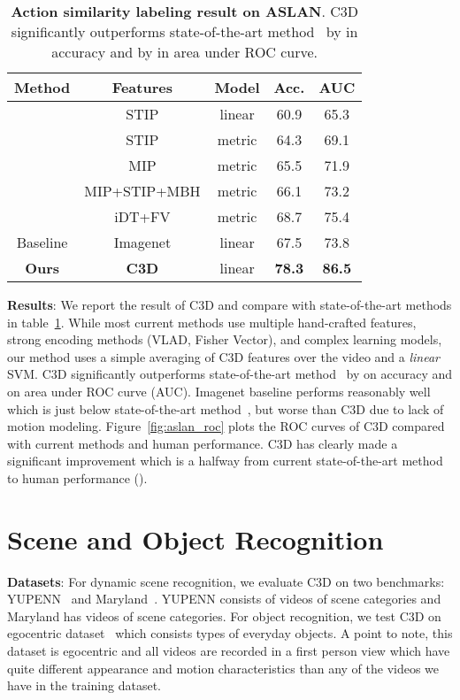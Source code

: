 \documentclass[10pt,twocolumn,letterpaper]{article}
\begin{document}
\begin{table}
\begin{center}
\begin{tabular}{|c|c|c|c|c|}
\hline
Method & Features & Model & Acc. & AUC \\
\hline
\cite{aslanPAMI12} & STIP & linear & 60.9 & 65.3 \\
\cite{aslanWS11} & STIP & metric & 64.3 & 69.1 \\
\cite{aslanECCV12} & MIP & metric & 65.5 & 71.9 \\
\cite{aslanCVPRW13} & MIP+STIP+MBH & metric & 66.1 & 73.2 \\
\cite{XPengSPL14} & iDT+FV & metric & 68.7 & 75.4 \\
Baseline & Imagenet & linear & 67.5 & 73.8 \\
{\bf Ours} & {\bf C3D} & linear & {\bf 78.3} & {\bf 86.5} \\ 
\hline
\end{tabular}
\end{center}
\vspace{-8pt}
\caption{{\bf Action similarity labeling result on ASLAN}. C3D significantly outperforms state-of-the-art method~\cite{XPengSPL14} by  in accuracy and by  in area under ROC curve.}
\label{tab:aslan_results}
\vspace{-16pt}
\end{table}

{\bf Results}: We report the result of C3D and compare with state-of-the-art methods in table~\ref{tab:aslan_results}. While most current methods use multiple hand-crafted features, strong encoding methods (VLAD, Fisher Vector), and complex learning models, our method uses a simple averaging of C3D features over the video and a \emph{linear} SVM. C3D significantly outperforms state-of-the-art method~\cite{XPengSPL14} by  on accuracy and  on area under ROC curve (AUC). Imagenet baseline performs reasonably well which is just  below state-of-the-art method~\cite{XPengSPL14}, but  worse than C3D due to lack of motion modeling. Figure~\ref{fig:aslan_roc} plots the ROC curves of C3D compared with current methods and human performance. C3D has clearly made a significant improvement which is a halfway from current state-of-the-art method to human performance (). 
\section{Scene and Object Recognition}
\label{sec:dynamic_scene}
\vspace{-6pt}
{\bf Datasets}: For dynamic scene recognition, we evaluate C3D on two benchmarks:  YUPENN~\cite{Derpanis12} and Maryland~\cite{umd_scene}. YUPENN consists of  videos of  scene categories and Maryland has  videos of  scene categories. For object recognition, we test C3D on egocentric dataset~\cite{Ren2009} which consists  types of everyday objects. A point to note, this dataset is egocentric and all videos are recorded in a first person view which have quite different appearance and motion characteristics than any of the videos we have in the training dataset.
\end{document}
